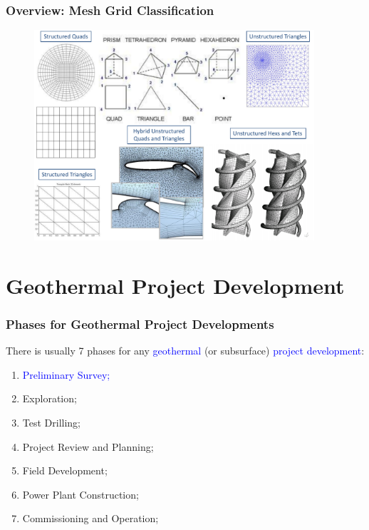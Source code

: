 \documentclass[10pt,compress]{beamer}
\newcommand{\blue}{\textcolor{blue}}
\begin{document}
\begin{frame}
 \frametitle{Overview: Mesh Grid Classification}

   \begin{figure}%
    \begin{center}
     \includegraphics[width=12.cm, height=7.8cm, clip]{./Pics/MeshGrid_Examples.pdf}\label{xx}
    \end{center}
   \end{figure}  











 \section{Geothermal Project Development} %

\begin{frame}
 \frametitle{Phases for Geothermal Project Developments} 
    There is usually 7 phases for any \blue{geothermal} (or subsurface) \blue{project development}: 
    \begin{enumerate}[1.]
       \item <1-> \blue{Preliminary Survey;}
       \item <1-> Exploration; 
       \item <1-> Test Drilling;
       \item <1-> Project Review and Planning;
       \item <1-> Field Development; 
       \item <1-> Power Plant Construction;
       \item <1-> Commissioning and Operation;
    \end{enumerate}
\end{frame}


\end{frame}
\end{document}
